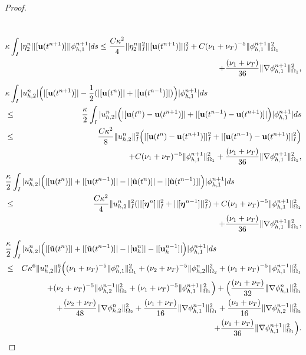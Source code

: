\documentclass[10pt]{article}%
\numberwithin{equation}{section}
\begin{document}
\begin{proof}
\begin{eqnarray}
	\label{err16}\\[7pt]
	\lefteqn{\kappa \int_{I}|\eta_{2}^n||[{\bf u}(t^{n+1})]||\phi_{h,1}^{n+1}|ds\leq\frac{C\kappa^2}{4}\|\eta_{2}^n\|_I^2||[{\bf u}(t^{n+1})]||^2_I+C{{ (\nu_1+\nu_T)^{-5}}}\|\phi_{h,1}^{n+1}\|_{\Omega_1}^2}\nonumber\\&&+\frac{{ (\nu_1+\nu_T)}}{36}\|\nabla \phi_{h,1}^{n+1}\|_{\Omega_1}^2,\label{err17}\\[7pt]
	\lefteqn{\kappa \int_{I}|u_{h,2}^n|\Big(|[{\bf u}(t^{n+1})]|-\frac{1}{2}(|[{\bf u}(t^{n})]|+|[{\bf u}(t^{n-1})]|)\Big)|\phi_{h,1}^{n+1}|ds}\nonumber\\
	&\leq&\frac{\kappa}{2}\int_{I}|u_{h,2}^n|\Big(|[{\bf u}(t^{n})-{\bf u}(t^{n+1})]|+|[{\bf u}(t^{n-1})-{\bf u}(t^{n+1})]|\Big)|\phi_{h,1}^{n+1}|ds\nonumber\\&\leq&\frac{C\kappa^2}{8}\|u_{h,2}^n\|_I^2\Big(|[{\bf u}(t^{n})-{\bf u}(t^{n+1})]|_I^2+|[{\bf u}(t^{n-1})-{\bf u}(t^{n+1})]|_I^2\Big)\nonumber\\&&+C{{ (\nu_1+\nu_T)^{-5}}}\|\phi_{h,1}^{n+1}\|_{\Omega_1}^2+\frac{{ (\nu_1+\nu_T)}}{36}\|\nabla \phi_{h,1}^{n+1}\|_{\Omega_1}^2,\label{err18}\allowdisplaybreaks\\[7pt]
	\lefteqn{\dfrac{\kappa}{2} \int_{I}|u_{h,2}^n|\Big(|[{\bf u}(t^{n})]|+|[{\bf u}(t^{n-1})]|-|[\tilde{\bf u}(t^{n})]|-|[\tilde{\bf u}(t^{n-1})]|\Big)|\phi_{h,1}^{n+1}|ds}\nonumber\\&\leq&\frac{C\kappa^2}{4}\|u_{h,2}^n\|_I^2(||[\boldsymbol{ \eta}^n]||^2_I+||[\boldsymbol{\eta}^{n-1}]||^2_I)+C{{ (\nu_1+\nu_T)^{-5}}}\|\phi_{h,1}^{n+1}\|_{\Omega_1}^2\nonumber\\&&+\frac{{ (\nu_1+\nu_T)}}{36}\|\nabla \phi_{h,1}^{n+1}\|_{\Omega_1}^2,\label{err19}\\[7pt]
	\lefteqn{\dfrac{\kappa}{2} \int_{I}|u_{h,2}^n|\Big(|[\tilde{\bf u}(t^{n})]|+|[\tilde{\bf u}(t^{n-1})]|-|[{\bf u}_h^{n}]|-|[{\bf u}_h^{n-1}]|\Big)|\phi_{h,1}^{n+1}|ds}\nonumber\\&\leq&C\kappa^{6}\|u_{h,2}^n\|^{6}_I\Big({{ (\nu_1+\nu_T)^{-5}}}\|{\bf \phi}_{h,1}^n\|^2_{\Omega_1}+{ (\nu_2+\nu_T)^{-5}}\|{\bf \phi}_{h,2}^n\|^2_{\Omega_2}+{ (\nu_1+\nu_T)^{-5}}\|{\bf \phi}_{h,1}^{n-1}\|^2_{\Omega_1}\nonumber\\&&+{ (\nu_2+\nu_T)^{-5}}\|{\bf \phi}_{h,2}^{n-1}\|^2_{\Omega_2}+{ (\nu_1+\nu_T)^{-5}}\|\phi_{h,1}^{n+1}\|^2_{\Omega_1}\Big)+\Big(\frac{{ (\nu_1+\nu_T)}}{32}\|\nabla{\bf \phi}_{h,1}^n\|^2_{\Omega_1}\nonumber\\&&+\frac{{ (\nu_2+\nu_T)}}{48}\|\nabla{\bf \phi}_{h,2}^n\|^2_{\Omega_2}+\frac{{ (\nu_1+\nu_T)}}{16}\|\nabla {\bf \phi}_{h,1}^{n-1}\|^2_{\Omega_1}+\frac{{ (\nu_2+\nu_T)}}{16}\|\nabla {\bf \phi}_{h,2}^{n-1}\|^2_{\Omega_2}\nonumber\\&&+\frac{{ (\nu_1+\nu_T)}}{36}\|\nabla \phi_{h,1}^{n+1}\|^2_{\Omega_1}\Big). \label{err20}

\end{eqnarray}
\end{proof}
\end{document}
